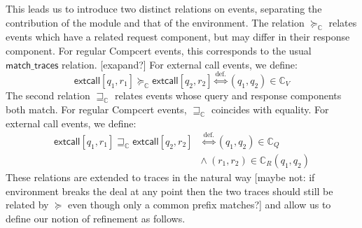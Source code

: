 \documentclass[sigplan,10pt,review,anonymous]{acmart}
\newcommand{\kw}[1]{\ensuremath{ \textsf{#1} }}
\begin{document}
This leads us to introduce two distinct relations on events,
separating the contribution of the module and that of the environment.
The relation $\succeq_\mathbb{C}$
relates events
which have a related request component,
but may differ in their response component.
For regular Compcert events,
this corresponds to the usual $\kw{match\_traces}$ relation.
[exapand?]
For external call events, we define:
\[
  \kw{extcall}[q_1, r_1] \succeq_\mathbb{C} \kw{extcall}[q_2, r_2]
  \stackrel{\text{def.}}{\Leftrightarrow}
  (q_1, q_2) \in \mathbb{C}_V
\]
The second relation $\sqsupseteq_\mathbb{C}$
relates events whose query and response components
both match.
For regular Compcert events,
$\sqsupseteq_\mathbb{C}$ coincides with equality.
For external call events, we define:
\begin{align*}
  \kw{extcall}[q_1, r_1] \sqsupseteq_\mathbb{C} \kw{extcall}[q_2, r_2]
  &\stackrel{\text{def.}}{\Leftrightarrow}
  (q_1, q_2) \in \mathbb{C}_Q \\ &\wedge \ 
  (r_1, r_2) \in \mathbb{C}_R(q_1, q_2)
\end{align*}
These relations are extended to traces in the natural way
[maybe not: if environment breaks the deal at any point
then the two traces should still be related by $\succeq$
even though only a common prefix matches?]
and allow us to define
our notion of refinement as follows.
\end{document}
